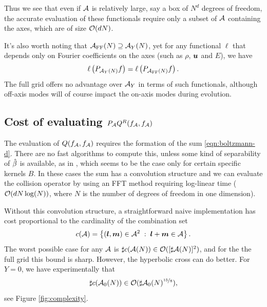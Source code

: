 Thus we see that even if $\mathcal{A}$ is relatively large, say a box of $N^d$ degrees
of freedom, the accurate evaluation of these functionals require only a subset
of $\mathcal{A}$ containing the axes, which are of size $\mathcal{O}(dN)$.

It's also worth noting that $\mathcal{A}_\text{FF}(N) \supseteq \mathcal{A}_Y(N)$, yet for any functional
$\ell$ that depends only on Fourier coefficients on the axes (such as $\rho$,
${\bm u}$ and $E$), we have
\[
    \ell\left(P_{\mathcal{A}_Y(N)}f\right) = \ell\left(P_{\mathcal{A}_\text{FF}(N)}f\right).
\]
The full grid offers no advantage over $\mathcal{A}_Y$ in terms of such functionals, although off-axis modes will of
course impact the on-axis modes during evolution.

\subsection{Cost of evaluating $P_{\mathcal{A}} Q^R(f_{\mathcal{A}},f_{\mathcal{A}})$}

The evaluation of $Q(f_{\mathcal{A}},f_{\mathcal{A}})$ requires the formation of the sum \eqref{eqn:boltzmann-d}. There are no
fast algorithms to compute this, unless some kind of separability of $\hat{\beta}$ is available, as in
\cite{Mouhot2006fac}, which seems to be the case only for certain specific kernels $B$. In these cases the sum has
a convolution structure and we can evaluate the collision operator by using an FFT method requiring log-linear
time ($\mathcal{O}(dN\log(N))$, where $N$ is the number of degrees of freedom in one dimension).

Without this convolution structure, a straightforward naive implementation has cost proportional to the
cardinality of the combination set
\[
    c(\mathcal{A}) = \left\{ ({\bm l},{\bm m})\in\mathcal{A}^2 \;:\; {\bm l}+{\bm m}\in\mathcal{A} \right\}.
\]
The worst possible case for any $\mathcal{A}$ is $\sharp c(\mathcal{A}(N)) \in \mathcal{O}([\sharp \mathcal{A}(N)]^2)$, and for the the full grid
this bound is sharp. However, the hyperbolic cross can do better. For $Y=0$, we have experimentally that
\[
    \sharp c(\mathcal{A}_0(N)) \in \mathcal{O}(\sharp\mathcal{A}_0(N)^{\nicefrac{15}{8}}),
\]
see Figure \ref{fig:complexity}.

